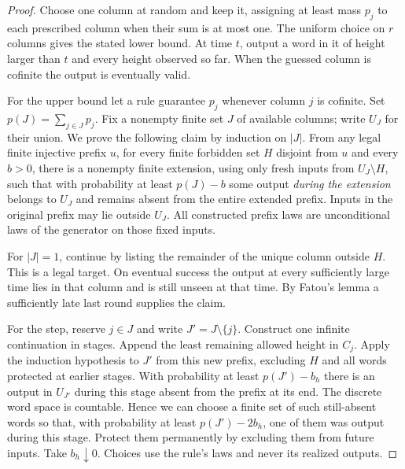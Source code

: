 \documentclass[11pt]{article}
\begin{document}
\begin{proof}
Choose one column at random and keep it, assigning at least mass $p_j$ to each prescribed column when their sum is at most one. The uniform choice on $r$ columns gives the stated lower bound. At time $t$, output a word in it of height larger than $t$ and every height observed so far. When the guessed column is cofinite the output is eventually valid.

For the upper bound let a rule guarantee $p_j$ whenever column $j$ is cofinite. Set $p(J)=\sum_{j\in J}p_j$. Fix a nonempty finite set $J$ of available columns; write $U_J$ for their union. We prove the following claim by induction on $|J|$. From any legal finite injective prefix $u$, for every finite forbidden set $H$ disjoint from $u$ and every $b>0$, there is a nonempty finite extension, using only fresh inputs from $U_J\setminus H$, such that with probability at least $p(J)-b$ some output \emph{during the extension} belongs to $U_J$ and remains absent from the entire extended prefix. Inputs in the original prefix may lie outside $U_J$. All constructed prefix laws are unconditional laws of the generator on those fixed inputs.

For $|J|=1$, continue by listing the remainder of the unique column outside $H$. This is a legal target. On eventual success the output at every sufficiently large time lies in that column and is still unseen at that time. By Fatou's lemma a sufficiently late last round supplies the claim.

For the step, reserve $j\in J$ and write $J'=J\setminus\{j\}$. Construct one infinite continuation in stages. Append the least remaining allowed height in $C_j$. Apply the induction hypothesis to $J'$ from this new prefix, excluding $H$ and all words protected at earlier stages. With probability at least $p(J')-b_h$ there is an output in $U_{J'}$ during this stage absent from the prefix at its end. The discrete word space is countable. Hence we can choose a finite set of such still-absent words so that, with probability at least $p(J')-2b_h$, one of them was output during this stage. Protect them permanently by excluding them from future inputs. Take $b_h\downarrow0$. Choices use the rule's laws and never its realized outputs.


\end{proof}
\end{document}
